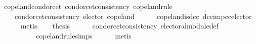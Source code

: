 \begin{isabellebody}
\isadelimdocument
%
\endisadelimdocument
%
\isatagdocument
%
\isamarkuptrue%
%
\endisatagdocument
{\isafolddocument}%
%
\isadelimdocument
%
\endisadelimdocument
{}\isamarkupfalse%
\ copeland{\isacharunderscore}{\kern0pt}condorcet{\isacharcolon}{\kern0pt}\ {\isachardoublequoteopen}condorcet{\isacharunderscore}{\kern0pt}consistency\ copeland{\isacharunderscore}{\kern0pt}rule{\isachardoublequoteclose}\isanewline
%
\isadelimproof
%
\endisadelimproof
%
\isatagproof
{}\isamarkupfalse%
\ {\isacharminus}{\kern0pt}\isanewline
\ \ \isamarkupfalse%
\isanewline
\ \ \ \ {\isachardoublequoteopen}condorcet{\isacharunderscore}{\kern0pt}consistency\ {\isacharparenleft}{\kern0pt}elector\ copeland{\isacharparenright}{\kern0pt}{\isachardoublequoteclose}\isanewline
\ \ \ \ \isamarkupfalse%
\ copeland{\isacharunderscore}{\kern0pt}is{\isacharunderscore}{\kern0pt}dcc\ dcc{\isacharunderscore}{\kern0pt}imp{\isacharunderscore}{\kern0pt}cc{\isacharunderscore}{\kern0pt}elector\isanewline
\ \ \ \ \isamarkupfalse%
\ metis\isanewline
\ \ \isamarkupfalse%
\ {\isacharquery}{\kern0pt}thesis\isanewline
\ \ \ \ \isamarkupfalse%
\ condorcet{\isacharunderscore}{\kern0pt}consistency{}\ electoral{\isacharunderscore}{\kern0pt}module{\isacharunderscore}{\kern0pt}def\isanewline
\ \ \ \ \ \ \ \ \ \ copeland{\isacharunderscore}{\kern0pt}rule{\isachardot}{\kern0pt}simps\isanewline
\ \ \ \ \isamarkupfalse%
\ metis\isanewline
{}\isamarkupfalse%
%
\endisatagproof
{\isafoldproof}%
%
\isadelimproof
\isanewline
%
\endisadelimproof
%
\isadelimtheory
\isanewline
%
\endisadelimtheory
%
\isatagtheory
{}\isamarkupfalse%
%
\endisatagtheory
{\isafoldtheory}%
%
\isadelimtheory
%
\endisadelimtheory
%
\end{isabellebody}%
\endinput
